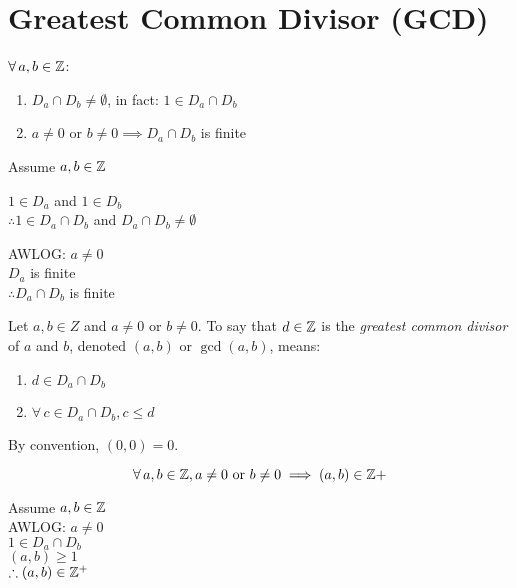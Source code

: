 \documentclass[letterpaper,12pt,fleqn]{article}
\begin{document}
\section*{Greatest Common Divisor (GCD)}

\begin{theorem}
  $\forall\,a,b\in\mathbb{Z}$:
  \begin{enumerate}
  \item $D_a\cap D_b\ne\emptyset$, in fact: $1\in D_a\cap D_b$
  \item $a\ne0$ or $b\ne0\implies D_a\cap D_b$ is finite
  \end{enumerate}
\end{theorem}

\begin{theproof}
  Assume $a,b\in \mathbb{Z}$

  $1\in D_a$ and $1\in D_b$ \\
  $\therefore 1\in D_a\cap D_b$ and $D_a\cap D_b\ne\emptyset$

  AWLOG: $a\ne0$ \\
  $D_a$ is finite \\
  $\therefore D_a\cap D_b$ is finite
\end{theproof}

\begin{definition}
  Let $a,b\in Z$ and $a\ne0$ or $b\ne0$. To say that $d\in\mathbb{Z}$ is the
  \emph{greatest common divisor} of $a$ and $b$, denoted $(a,b)$ or
  $\gcd(a,b)$, means:
  \begin{enumerate}
  \item $d\in D_a\cap D_b$
    
  \item $\forall\,c\in D_a\cap D_b,c\le d$
  \end{enumerate}

  By convention, $(0,0)=0$.
\end{definition}

\begin{theorem}
  \listbreak
  \[\forall\,a,b\in\Z,a\ne0\ \mbox{or}\ b\ne0\implies(a,b)\in\Z+\]
\end{theorem}

\begin{theproof}
  Assume $a,b\in\mathbb{Z}$ \\
  AWLOG: $a\ne0$ \\
  $1\in D_a\cap D_b$ \\
  $(a,b)\ge1$ \\
  $\therefore (a,b)\in\mathbb{Z}^+$
\end{theproof}
\end{document}
